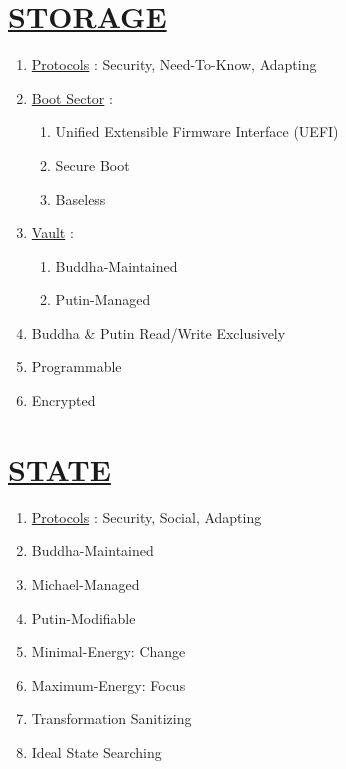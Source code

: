 \documentclass[11pt]{article}
\begin{document}
\section*{\ul{STORAGE}}
\begin{enumerate}
	\item[] \ul{Protocols} : Security, Need-To-Know, Adapting
	
	\item[] \ul{Boot Sector} :
	\begin{enumerate}
		\item[] Unified Extensible Firmware Interface (UEFI)
		\item[] Secure Boot
		\item[] Baseless
	\end{enumerate}

	\item[] \ul{Vault} :
	\begin{enumerate}
		\item[] Buddha-Maintained
		\item[] Putin-Managed
	\end{enumerate}
	
	\item[] Buddha \& Putin Read/Write Exclusively
	\item[] Programmable
	\item[] Encrypted

\end{enumerate}


\section*{\ul{STATE}}
\begin{enumerate}
	\item[] \ul{Protocols} : Security, Social, Adapting
	
	\item[] Buddha-Maintained
	\item[] Michael-Managed
	\item[] Putin-Modifiable
	\item[] Minimal-Energy: Change
	\item[] Maximum-Energy: Focus
	\item[] Transformation Sanitizing
	\item[] Ideal State Searching
	
\end{enumerate}
\end{document}
